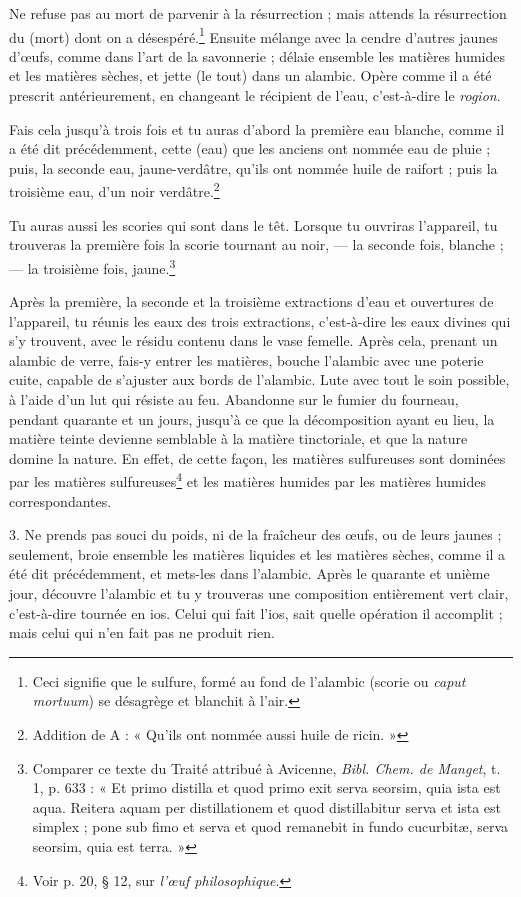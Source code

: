 \documentclass[landscape, a4paper, 11pt, oneside, polutonikogreek, french]{article}
\begin{document}
Ne refuse pas au mort de parvenir à la résurrection ; mais attends la résurrection du (mort) dont on a désespéré.\footnote{Ceci signifie que le sulfure, formé au fond de l'alambic (scorie ou \emph{caput mortuum}) se désagrège et blanchit à l'air.} Ensuite mélange avec la cendre d'autres jaunes d'œufs, comme dans l'art de la savonnerie ; délaie ensemble les matières humides et les matières sèches, et jette (le tout) dans un alambic. Opère comme il a été prescrit antérieurement, en changeant le récipient de l'eau, c'est-à-dire le \emph{rogion}.

Fais cela jusqu'à trois fois et tu auras d'abord la première eau blanche, comme il a été dit précédemment, cette (eau) que les anciens ont nommée eau de pluie ; puis, la seconde eau, jaune-verdâtre, qu'ils ont nommée huile de raifort ; puis la troisième eau, d'un noir verdâtre.\footnote{Addition de A : « Qu'ils ont nommée aussi huile de ricin. »}

Tu auras aussi les scories qui sont dans le têt. Lorsque tu ouvriras l'appareil, tu trouveras la première fois la scorie tournant au noir, --- la seconde fois, blanche ;--- la troisième fois, jaune.\footnote{Comparer ce texte du Traité attribué à Avicenne, \emph{Bibl. Chem. de Manget}, t. 1, p. 633 : « Et primo distilla et quod primo exit serva seorsim, quia ista est aqua. Reitera aquam per distillationem et quod distillabitur serva et ista est simplex ; pone sub fimo et serva et quod remanebit in fundo cucurbitæ, serva seorsim, quia est terra. »}

Après la première, la seconde et la troisième extractions d'eau et ouvertures de l'appareil, tu réunis les eaux des trois extractions, c'est-à-dire les eaux divines qui s'y trouvent, avec le résidu contenu dans le vase femelle. Après cela, prenant un alambic de verre, fais-y entrer les matières, bouche l'alambic avec une poterie cuite, capable de s'ajuster aux bords de l'alambic. Lute avec tout le soin possible, à l'aide d'un lut qui résiste au feu. Abandonne sur le fumier du fourneau, pendant quarante et un jours, jusqu'à ce que la décomposition ayant eu lieu, la matière teinte devienne semblable à la matière tinctoriale, et que la nature domine la nature. En effet, de cette façon, les matières sulfureuses sont dominées par les matières sulfureuses\footnote{Voir p. 20, § 12, sur \emph{l'œuf philosophique}.} et les matières humides par les matières humides correspondantes.

3. Ne prends pas souci du poids, ni de la fraîcheur des œufs, ou de leurs jaunes ; seulement, broie ensemble les matières liquides et les matières sèches, comme il a été dit précédemment, et mets-les dans l'alambic. Après le quarante et unième jour, découvre l'alambic et tu y trouveras une composition entièrement vert clair, c'est-à-dire tournée en ios. Celui qui fait l'ios, sait quelle opération il accomplit ; mais celui qui n'en fait pas ne produit rien.
\end{document}

